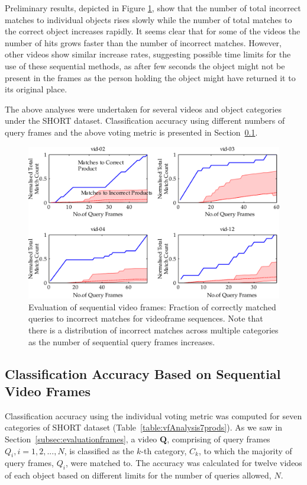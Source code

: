 Preliminary results, depicted in Figure \ref{fig:prd003b}, show that the number of total incorrect matches to individual objects rises slowly while the number of total matches to the correct object increases rapidly. It seems clear that for some of the videos the number of hits grows faster than the number of incorrect matches. However, other videos show similar increase rates, suggesting possible time limits for the use of these sequential methods, as after few seconds the object might not be present in the frames as the person holding the object might have returned it to its original place.

The above analyses were undertaken for several videos and object categories under the SHORT dataset. Classification accuracy using different numbers of query frames and the above voting metric is presented in Section~\ref{sec:expResults2}.


\begin{figure}[h!]
\centering
\includegraphics[width=\linewidth]{./gfx/Chapter03/prd0030shadedPlots-4-latex.pdf}
\caption{Evaluation of sequential video frames: Fraction of correctly matched queries to incorrect matches for videoframe sequences. Note that there is a distribution of incorrect matches across multiple categories as the number of sequential query frames increases.}        
\label{fig:prd003b}
\end{figure}


\subsection{Classification Accuracy Based on Sequential Video Frames} \label{sec:expResults2}

Classification accuracy using the individual voting metric was computed for seven categories of SHORT dataset (Table~\ref{table:vfAnalysis7prods}). As we saw in Section~\ref{subsec:evaluationframes}, a video $\mathbf{Q}$, comprising of query frames $Q_i, i = 1,2,...,N$, is classified as the $k$-th category, $C_k$, to which the majority of query frames, $Q_i$, were matched to. The accuracy was calculated for twelve videos of each object based on different limits for the number of queries allowed, $N$.

